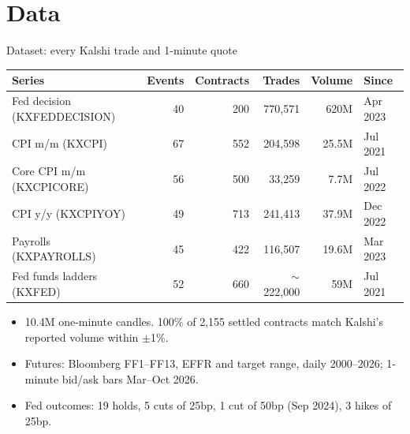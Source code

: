 \documentclass[aspectratio=169, 11pt, t]{beamer}
\begin{document}
\section{Data}
\begin{frame}{Dataset: every Kalshi trade and 1-minute quote}
  \centering\footnotesize
  \begin{tabular}{lrrrrl}
    \toprule
    Series & Events & Contracts & Trades & Volume & Since \\
    \midrule
    Fed decision (KXFEDDECISION) & 40 & 200 & 770,571 & 620M & Apr 2023 \\
    CPI m/m (KXCPI) & 67 & 552 & 204,598 & 25.5M & Jul 2021 \\
    Core CPI m/m (KXCPICORE) & 56 & 500 & 33,259 & 7.7M & Jul 2022 \\
    CPI y/y (KXCPIYOY) & 49 & 713 & 241,413 & 37.9M & Dec 2022 \\
    Payrolls (KXPAYROLLS) & 45 & 422 & 116,507 & 19.6M & Mar 2023 \\
    \midrule
    Fed funds ladders (KXFED) & 52 & 660 & $\sim$222,000 & 59M & Jul 2021 \\
    \bottomrule
  \end{tabular}

  \vspace{10pt}
  \raggedright
  \begin{itemize}\footnotesize
    \item 10.4M one-minute candles. 100\% of 2,155 settled contracts match Kalshi's reported volume within $\pm$1\%.
    \item Futures: Bloomberg FF1--FF13, EFFR and target range, daily 2000--2026; 1-minute bid/ask bars Mar--Oct 2026.
    \item Fed outcomes: 19 holds, 5 cuts of 25bp, 1 cut of 50bp (Sep 2024), 3 hikes of 25bp.
  \end{itemize}
\end{frame}
\end{document}
